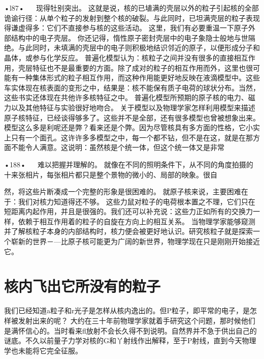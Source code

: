 •l87•
  
现得牡别突出。
这就是说，核的已埴满的壳层以外的粒子引起核的全部诡谕行径：从单个粒子的发射到整个核的破裂。与此同时，已坦满壳层的粒子表现得谦虚得多：它们不直接参与核的这些活动。
这里，我们有必要重温一下原子外部结构中的电子壳层。
你还记得，惰性原子密封壳层中的电子象隐士般地与世隔绝。与此同时，未填满的壳层中的电子则积极地结识邻近的原子，以便形成分子和晶体，或参与化学反应。
普遍化模型认为：核粒子之间并没有很多的直接相互作用，壳层特征也不是最重要的方面。除了成对的粒子的相互作用而外，这里也很可能有一种集体形式的粒子相互作用，而这种作用能更好地反映在液滴模型中。这些车实体现在核表面的变形之中，结果是：核不能保有质子电荷的球状分布。当然，这些书实还体现在共他许多核特征之中。
普遍化模型所预期的原子核的电力、磁力以及其他特征与实验很好地吻合。
关于模型以及物理学家怎样利用模型来描述原子核特征，已经谈得够多了。这些并不是全部，还有很多模型也曾被想象出来。
模型这么多是利呢还是弊？看来还是个弊。因为尽管核具有多方面的性格，它小实上只有一个面孔。这许许多多模型之中，每一个都不钻，但不是在这，就是在那方面不能令人满意。这说明：虽然核是个统一体，但这个统一体又是非常

•188•
  
难以把握并理解的。
就像在不同的照明条件下，从不同的角度拍摄的十来张相片，每张相片都只是整个景物的微小的、局部的映象。很自

然，将这些片断凑成一个完整的形象是很困难的。
就原子核来说，主要困难在于：我们对核力知道得还不够。
这些力鼠对粒子的电荷根本置之不理，它们只在短距离内起作用，并且是很强的。我们还可以补充说：这些力正如所有的交换力一样，依赖于相互作用着的粒子的自旋在方向上的相互关系。
当物理学家能够窥测并了解核粒子本身的内部结构时，核力便会被更好地认识。研究核粒子就是探索一个崭新的世界－—比原子核可能更为广阔的新世界，物理学现在只是刚刚开始接近它。

\section{核内飞出它所没有的粒子}

我们已经知道a粒子和r光子是怎样从核内逸出的。但P粒子，即平常的电子，是怎样被发射出来的呢？
大约在三十年前物理学家就着手研究这个问题，那时候他们是满怀信心的。当时看来fl放射不会长久得不到说明。自然界并不急于供出自己的谜底。不久以前量子力学对核的G和丫射线作出解释，至于P射线，直到今天物理学也未能将它完全征服。

